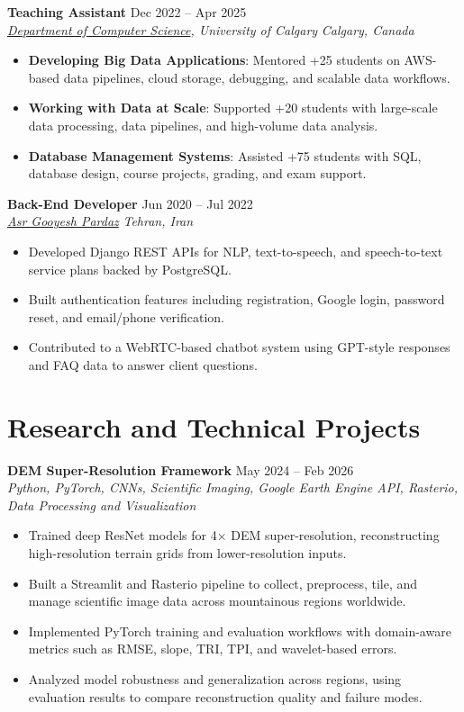 \documentclass[a4paper,10pt]{article}
\newcommand{\resumeSubheading}[4]{
    \textbf{#1} \hfill #2 \\
    \textit{#3} \hfill \textit{#4}
}
\begin{document}
\resumeSubheading
{Teaching Assistant}
{Dec 2022 -- Apr 2025}
{\href{https://science.ucalgary.ca/computer-science} {Department of Computer Science}, University of Calgary}
{Calgary, Canada}
\begin{itemize}[leftmargin=0.25in]
    \item \textbf{Developing Big Data Applications}: Mentored +25 students on AWS-based data pipelines, cloud storage, debugging, and scalable data workflows.
    \item \textbf{Working with Data at Scale}: Supported +20 students with large-scale data processing, data pipelines, and high-volume data analysis.
    \item \textbf{Database Management Systems}: Assisted +75 students with SQL, database design, course projects, grading, and exam support.
\end{itemize}

\resumeSubheading
{Back-End Developer}
{Jun 2020 -- Jul 2022}
{\href{https://asr-gooyesh.com/en/}{Asr Gooyesh Pardaz}}
{Tehran, Iran}
\begin{itemize}[leftmargin=0.25in]
    \item Developed Django REST APIs for NLP, text-to-speech, and speech-to-text service plans backed by PostgreSQL.
    \item Built authentication features including registration, Google login, password reset, and email/phone verification.
    \item Contributed to a WebRTC-based chatbot system using GPT-style responses and FAQ data to answer client questions.
\end{itemize}


\section*{Research and Technical Projects}

\noindent
\textbf{DEM Super-Resolution Framework} \hfill May 2024 -- Feb 2026 \\
\textit{Python, PyTorch, CNNs, Scientific Imaging, Google Earth Engine API, Rasterio, Data Processing and Visualization}
\begin{itemize}[leftmargin=0.25in]
    \item Trained deep ResNet models for 4$\times$ DEM super-resolution, reconstructing high-resolution terrain grids from lower-resolution inputs.
    \item Built a Streamlit and Rasterio pipeline to collect, preprocess, tile, and manage scientific image data across mountainous regions worldwide.
    \item Implemented PyTorch training and evaluation workflows with domain-aware metrics such as RMSE, slope, TRI, TPI, and wavelet-based errors.
    \item Analyzed model robustness and generalization across regions, using evaluation results to compare reconstruction quality and failure modes.
\end{itemize}
\end{document}
